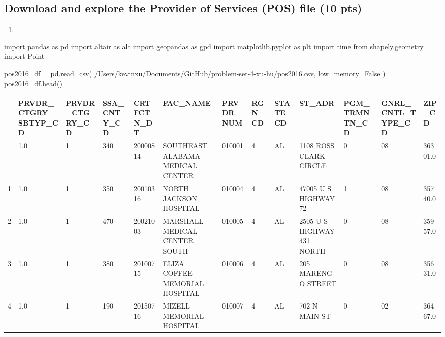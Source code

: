 \documentclass[
  letterpaper,
  DIV=11,
  numbers=noendperiod]{scrartcl}
\newenvironment{Shaded}{\begin{snugshade}}{\end{snugshade}}
\newcommand{\ImportTok}[1]{\textcolor[rgb]{0.00,0.46,0.62}{#1}}
\newcommand{\NormalTok}[1]{\textcolor[rgb]{0.00,0.23,0.31}{#1}}
\newcommand{\OperatorTok}[1]{\textcolor[rgb]{0.37,0.37,0.37}{#1}}
\newcommand{\StringTok}[1]{\textcolor[rgb]{0.13,0.47,0.30}{#1}}
\newcommand{\VariableTok}[1]{\textcolor[rgb]{0.07,0.07,0.07}{#1}}
\providecommand{\tightlist}{%
  \setlength{\itemsep}{0pt}\setlength{\parskip}{0pt}}\usepackage{longtable,booktabs,array}
\begin{document}
\subsection{Download and explore the Provider of Services (POS) file (10
pts)}\label{download-and-explore-the-provider-of-services-pos-file-10-pts}

\begin{enumerate}
\def\labelenumi{\arabic{enumi}.}
\tightlist
\item
\end{enumerate}

\begin{Shaded}
\begin{Highlighting}[]
\ImportTok{import}\NormalTok{ pandas }\ImportTok{as}\NormalTok{ pd}
\ImportTok{import}\NormalTok{ altair }\ImportTok{as}\NormalTok{ alt}
\ImportTok{import}\NormalTok{ geopandas }\ImportTok{as}\NormalTok{ gpd}
\ImportTok{import}\NormalTok{ matplotlib.pyplot }\ImportTok{as}\NormalTok{ plt}
\ImportTok{import}\NormalTok{ time}
\ImportTok{from}\NormalTok{ shapely.geometry }\ImportTok{import}\NormalTok{ Point}

\NormalTok{pos2016\_df }\OperatorTok{=}\NormalTok{ pd.read\_csv(}
    \StringTok{\textquotesingle{}/Users/kevinxu/Documents/GitHub/problem{-}set{-}4{-}xu{-}hu/pos2016.csv\textquotesingle{}}\NormalTok{,}
\NormalTok{    low\_memory}\OperatorTok{=}\VariableTok{False}
\NormalTok{)}
\NormalTok{pos2016\_df.head()}
\end{Highlighting}
\end{Shaded}

\begin{longtable}[]{@{}lllllllllllll@{}}
\toprule\noalign{}
& PRVDR\_CTGRY\_SBTYP\_CD & PRVDR\_CTGRY\_CD & SSA\_CNTY\_CD &
CRTFCTN\_DT & FAC\_NAME & PRVDR\_NUM & RGN\_CD & STATE\_CD & ST\_ADR &
PGM\_TRMNTN\_CD & GNRL\_CNTL\_TYPE\_CD & ZIP\_CD \\
\midrule\noalign{}
\endhead
\bottomrule\noalign{}
\endlastfoot
0 & 1.0 & 1 & 340 & 20000814 & SOUTHEAST ALABAMA MEDICAL CENTER & 010001
& 4 & AL & 1108 ROSS CLARK CIRCLE & 0 & 08 & 36301.0 \\
1 & 1.0 & 1 & 350 & 20010316 & NORTH JACKSON HOSPITAL & 010004 & 4 & AL
& 47005 U S HIGHWAY 72 & 1 & 08 & 35740.0 \\
2 & 1.0 & 1 & 470 & 20021003 & MARSHALL MEDICAL CENTER SOUTH & 010005 &
4 & AL & 2505 U S HIGHWAY 431 NORTH & 0 & 08 & 35957.0 \\
3 & 1.0 & 1 & 380 & 20100715 & ELIZA COFFEE MEMORIAL HOSPITAL & 010006 &
4 & AL & 205 MARENGO STREET & 0 & 08 & 35631.0 \\
4 & 1.0 & 1 & 190 & 20150716 & MIZELL MEMORIAL HOSPITAL & 010007 & 4 &
AL & 702 N MAIN ST & 0 & 02 & 36467.0 \\
\end{longtable}
\end{document}
